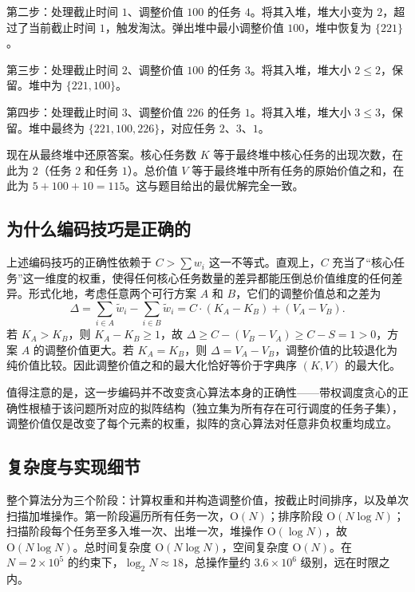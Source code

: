 第二步：处理截止时间 $1$、调整价值 $100$ 的任务 $4$。将其入堆，堆大小变为 $2$，超过了当前截止时间 $1$，触发淘汰。弹出堆中最小调整价值 $100$，堆中恢复为 $\{221\}$。

第三步：处理截止时间 $2$、调整价值 $100$ 的任务 $3$。将其入堆，堆大小 $2 \le 2$，保留。堆中为 $\{221, 100\}$。

第四步：处理截止时间 $3$、调整价值 $226$ 的任务 $1$。将其入堆，堆大小 $3 \le 3$，保留。堆中最终为 $\{221, 100, 226\}$，对应任务 $2$、$3$、$1$。

现在从最终堆中还原答案。核心任务数 $K$ 等于最终堆中核心任务的出现次数，在此为 $2$（任务 $2$ 和任务 $1$）。总价值 $V$ 等于最终堆中所有任务的原始价值之和，在此为 $5 + 100 + 10 = 115$。这与题目给出的最优解完全一致。

\subsection{为什么编码技巧是正确的}

上述编码技巧的正确性依赖于 $C > \sum w_i$ 这一不等式。直观上，$C$ 充当了“核心任务”这一维度的权重，使得任何核心任务数量的差异都能压倒总价值维度的任何差异。形式化地，考虑任意两个可行方案 $A$ 和 $B$，它们的调整价值总和之差为
\[
\Delta = \sum_{i \in A} \tilde{w}_i - \sum_{i \in B} \tilde{w}_i = C \cdot (K_A - K_B) + (V_A - V_B).
\]
若 $K_A > K_B$，则 $K_A - K_B \ge 1$，故 $\Delta \ge C - (V_B - V_A) \ge C - S = 1 > 0$，方案 $A$ 的调整价值更大。若 $K_A = K_B$，则 $\Delta = V_A - V_B$，调整价值的比较退化为纯价值比较。因此调整价值之和的最大化恰好等价于字典序 $(K, V)$ 的最大化。

值得注意的是，这一步编码并不改变贪心算法本身的正确性——带权调度贪心的正确性根植于该问题所对应的拟阵结构（独立集为所有存在可行调度的任务子集），调整价值仅是改变了每个元素的权重，拟阵的贪心算法对任意非负权重均成立。

\subsection{复杂度与实现细节}

整个算法分为三个阶段：计算权重和并构造调整价值，按截止时间排序，以及单次扫描加堆操作。第一阶段遍历所有任务一次，$\mathrm{O}(N)$；排序阶段 $\mathrm{O}(N \log N)$；扫描阶段每个任务至多入堆一次、出堆一次，堆操作 $\mathrm{O}(\log N)$，故 $\mathrm{O}(N \log N)$。总时间复杂度 $\mathrm{O}(N \log N)$，空间复杂度 $\mathrm{O}(N)$。在 $N = 2 \times 10^5$ 的约束下，$\log_2 N \approx 18$，总操作量约 $3.6 \times 10^6$ 级别，远在时限之内。

